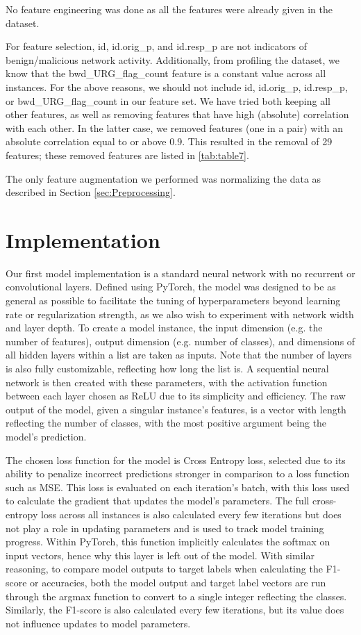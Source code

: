 \documentclass[11pt]{article}
\begin{document}
No feature engineering was done as all the features were already given in the dataset.

For feature selection, id, id.orig\_p, and id.resp\_p are not indicators of benign/malicious network activity. Additionally, from profiling the dataset, we know that the bwd\_URG\_flag\_count feature is a constant value across all instances. For the above reasons, we should not include id, id.orig\_p, id.resp\_p, or bwd\_URG\_flag\_count in our feature set. We have tried both keeping all other features, as well as removing features that have high (absolute) correlation with each other. In the latter case, we removed features (one in a pair) with an absolute correlation equal to or above 0.9. This resulted in the removal of 29 features; these removed features are listed in \ref{tab:table7}.

The only feature augmentation we performed was normalizing the data as described in Section \ref{sec:Preprocessing}.

\section{Implementation}
\label{sec:Implementation}

Our first model implementation is a standard neural network with no recurrent or convolutional layers. Defined using PyTorch, the model was designed to be as general as possible to facilitate the tuning of hyperparameters beyond learning rate or regularization strength, as we also wish to experiment with network width and layer depth. To create a model instance, the input dimension (e.g. the number of features), output dimension (e.g. number of classes), and dimensions of all hidden layers within a list are taken as inputs. Note that the number of layers is also fully customizable, reflecting how long the list is. A sequential neural network is then created with these parameters, with the activation function between each layer chosen as ReLU due to its simplicity and efficiency. The raw output of the model, given a singular instance’s features, is a vector with length reflecting the number of classes, with the most positive argument being the model’s prediction.

The chosen loss function for the model is Cross Entropy loss, selected due to its ability to penalize incorrect predictions stronger in comparison to a loss function such as MSE. This loss is evaluated on each iteration’s batch, with this loss used to calculate the gradient that updates the model’s parameters. The full cross-entropy loss across all instances is also calculated every few iterations but does not play a role in updating parameters and is used to track model training progress. Within PyTorch, this function implicitly calculates the softmax on input vectors, hence why this layer is left out of the model. With similar reasoning, to compare model outputs to target labels when calculating the F1-score or accuracies, both the model output and target label vectors are run through the argmax function to convert to a single integer reflecting the classes. Similarly, the F1-score is also calculated every few iterations, but its value does not influence updates to model parameters. 
\end{document}
